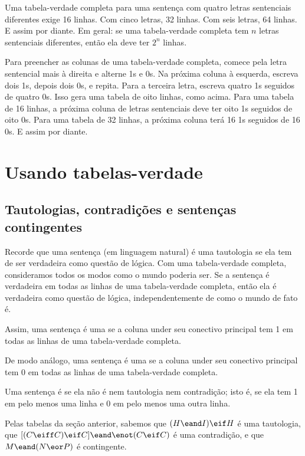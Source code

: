 Uma tabela-verdade completa para uma sentença com quatro letras sentenciais diferentes exige 16 linhas. Com cinco letras, 32 linhas. Com seis letras, 64 linhas. E assim por diante. Em geral: se uma tabela-verdade completa tem $n$ letras sentenciais diferentes, então ela deve ter $2^n$ linhas.

Para preencher as colunas de uma tabela-verdade completa, comece pela letra sentencial mais à direita e alterne 1s e 0s. Na próxima coluna à esquerda, escreva dois 1s, depois dois 0s, e repita. Para a terceira letra, escreva quatro 1s seguidos de quatro 0s. Isso gera uma tabela de oito linhas, como acima. Para uma tabela de 16 linhas, a próxima coluna de letras sentenciais deve ter oito 1s seguidos de oito 0s. Para uma tabela de 32 linhas, a próxima coluna terá 16 1s seguidos de 16 0s. E assim por diante.


\section{Usando tabelas-verdade}

\subsection{Tautologias, contradições e sentenças contingentes}

Recorde que uma sentença (em linguagem natural) é uma tautologia se ela tem de ser verdadeira como questão de lógica. Com uma tabela-verdade completa, consideramos todos os modos como o mundo poderia ser. Se a sentença é verdadeira em todas as linhas de uma tabela-verdade completa, então ela é verdadeira como questão de lógica, independentemente de como o mundo de fato é.

Assim, uma sentença é uma  se a coluna under seu conectivo principal tem 1 em todas as linhas de uma tabela-verdade completa.

De modo análogo, uma sentença é uma  se a coluna under seu conectivo principal tem 0 em todas as linhas de uma tabela-verdade completa.

Uma sentença é  se ela não é nem tautologia nem contradição; isto é, se ela tem 1 em pelo menos uma linha e 0 em pelo menos uma outra linha.

Pelas tabelas da seção anterior, sabemos que $(H\eand I)\eif H$ é uma tautologia, que $[(C\eiff C) \eif C] \eand \enot(C \eif C)$ é uma contradição, e que $M \eand (N \eor P)$ é contingente.


